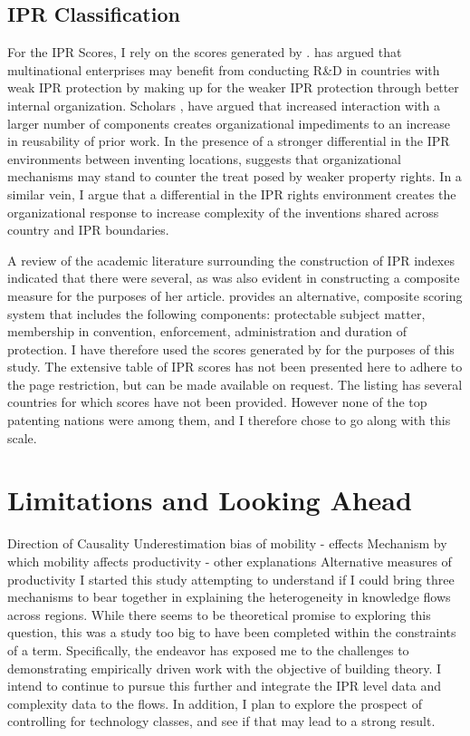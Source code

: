 \documentclass[12pt]{article}
\begin{document}
\subsection{IPR Classification}
For the IPR Scores, I rely on the scores generated by \cite{Lesser2010}. 
\cite{Zhao2006} has argued  that multinational enterprises may benefit from conducting R\&D in countries with weak IPR protection by  making up for the weaker IPR protection through better internal organization.
Scholars \citep{Yayavaram2008, Baldwin2015}, have argued that increased interaction with a larger number of components creates organizational impediments to an increase in reusability of prior work. In the presence of a stronger differential in the IPR environments between inventing locations, \cite{Zhao2006} suggests that organizational mechanisms may stand to counter the treat posed by weaker property rights. In a similar vein, I argue that a differential in the IPR rights environment creates the organizational response to increase complexity of the inventions shared across country and IPR boundaries. 

A review of the academic literature surrounding the construction of IPR indexes indicated that there were several, as was also evident in \cite{Zhao2006} constructing a composite measure for the purposes of her article. \cite{Lesser2010} provides an alternative, composite scoring system that includes the following components: protectable subject matter, membership in convention, enforcement, administration and duration of protection. I have therefore used the scores generated by \cite{Lesser2010} for the purposes of this study. The extensive table of IPR scores has not been presented here to adhere to the page restriction, but can be made available on request. The listing has several countries for which scores have not been provided. However none of the top patenting nations were among them, and I therefore chose to go along with this scale.

\section{Limitations and Looking Ahead}
Direction of Causality
Underestimation bias of mobility - effects
Mechanism by which mobility affects productivity - other explanations
Alternative measures of productivity
I started this study attempting to understand if I could bring three mechanisms to bear together in explaining the heterogeneity in knowledge flows across regions. While there seems to be theoretical promise to exploring this question, this was a study too big to have been completed within the constraints of a term. Specifically, the endeavor has exposed me to the challenges to demonstrating empirically driven work with the objective of building theory. I intend to continue to pursue this further and integrate the IPR level data and complexity data to the flows. In addition, I plan to explore the prospect of controlling for technology classes, and see if that may lead to a strong result.  
\end{document}
